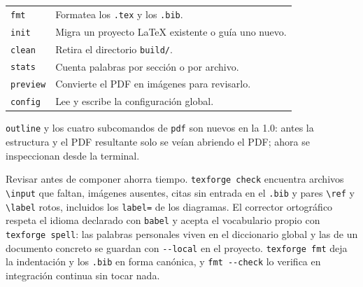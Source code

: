 \begin{table}[H]
\begin{tabularx}{\linewidth}{@{}lX@{}}
    \texttt{fmt} & Formatea los \texttt{.tex} y los \texttt{.bib}. \\
    \texttt{init} & Migra un proyecto \LaTeX{} existente o guía uno nuevo. \\
    \texttt{clean} & Retira el directorio \texttt{build/}. \\
    \texttt{stats} & Cuenta palabras por sección o por archivo. \\
    \texttt{preview} & Convierte el PDF en imágenes para revisarlo. \\
    \texttt{config} & Lee y escribe la configuración global. \\
    \bottomrule
  \end{tabularx}
\end{table}

\begin{novabox}
  \texttt{outline} y los cuatro subcomandos de \texttt{pdf} son nuevos en la
  1.0: antes la estructura y el PDF resultante solo se veían abriendo el
  PDF; ahora se inspeccionan desde la terminal.
\end{novabox}

Revisar antes de componer ahorra tiempo. \texttt{texforge check} encuentra
archivos \texttt{\textbackslash input} que faltan, imágenes ausentes,
citas sin entrada en el \texttt{.bib} y pares \texttt{\textbackslash ref} y
\texttt{\textbackslash label} rotos, incluidos los \texttt{label=} de los
diagramas. El corrector ortográfico respeta el idioma declarado con
\texttt{babel} y acepta el vocabulario propio con \texttt{texforge spell}:
las palabras personales viven en el diccionario global y las de un documento
concreto se guardan con \texttt{-{}-local} en el proyecto. \texttt{texforge
  fmt} deja la indentación y los \texttt{.bib} en forma canónica, y
\texttt{fmt -{}-check} lo verifica en integración continua sin tocar nada.
